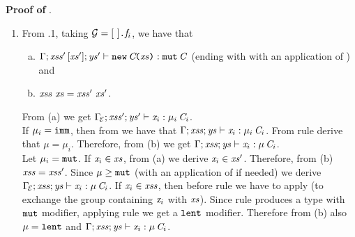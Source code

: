 \medskip
\noindent
{\bf Proof of }.  
\begin{enumerate}
  \item From .1, taking ${\cal{G}}=[\ ]\texttt{.}\mathit{f}_i$, we have that 
  \begin{enumerate} [(a)]
\item  $\Gamma;\mathit{xss}'\,[\mathit{xs}'];\mathit{ys}'\vdash {\texttt{new}\,\mathit{C}\!\texttt{(}\mathit{xs}\texttt{)}}:\texttt{mut}\,\mathit{C}$ (ending with with an application of ) and
\item 
 $\LentLocked\ \xs=\LentLocked'\ \xs'$.
\end{enumerate}
From (a) we get ${\Gamma_{\!{\cal{E}}}};\mathit{xss}';\mathit{ys}'\vdash \mathit{x}_i:\mu_i\,\mathit{C}_i$.\\
If $\mu_i=\texttt{imm}$, then from  we have that $\Gamma;\mathit{xss};\mathit{ys}\vdash \mathit{x}_i:\mu_i\,\mathit{C}_i$. From rule  derive that $\mu=\mu_i$. Therefore, from (b) we get $\Gamma;\mathit{xss};\mathit{ys}\vdash \mathit{x}_i:\mu\,\mathit{C}_i$.\\
Let $\mu_i=\texttt{mut}$. If $\mathit{x}_i\in\mathit{xs}$, from (a) we derive  $\mathit{x}_i\in\mathit{xs}'$. Therefore, from (b)
$\mathit{xss}=\mathit{xss}'$. Since $\mu\geq\texttt{mut}$ (with an application of
 if needed) we derive  ${\Gamma_{\!{\cal{E}}}};\mathit{xss};\mathit{ys}\vdash \mathit{x}_i:\mu\,\mathit{C}_i$.
If $\mathit{x}_i\in\mathit{xss}$, then before rule  we have to apply   (to exchange the group containing $\mathit{x}_i$ with $\mathit{xs}$). Since rule  produces a type with $\texttt{mut}$ modifier, applying rule  
we get a $\texttt{lent}$ modifier. Therefore from (b) also $\mu=\texttt{lent}$ and
$\Gamma;\mathit{xss};\mathit{ys}\vdash \mathit{x}_i:\mu\,\mathit{C}_i$. 
 

\end{enumerate}
